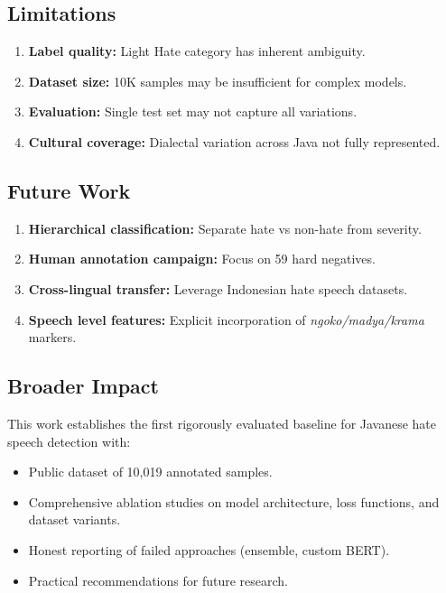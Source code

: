 \documentclass[10pt,journal]{IEEEtran}
\begin{document}
\subsection{Limitations}

\begin{enumerate}[leftmargin=*,noitemsep,topsep=0pt]
\item \textbf{Label quality:} Light Hate category has inherent ambiguity.
\item \textbf{Dataset size:} 10K samples may be insufficient for complex models.
\item \textbf{Evaluation:} Single test set may not capture all variations.
\item \textbf{Cultural coverage:} Dialectal variation across Java not fully represented.
\end{enumerate}

\subsection{Future Work}

\begin{enumerate}[leftmargin=*,noitemsep,topsep=0pt]
\item \textbf{Hierarchical classification:} Separate hate vs non-hate from severity.
\item \textbf{Human annotation campaign:} Focus on 59 hard negatives.
\item \textbf{Cross-lingual transfer:} Leverage Indonesian hate speech datasets.
\item \textbf{Speech level features:} Explicit incorporation of \textit{ngoko/madya/krama} markers.
\end{enumerate}

\subsection{Broader Impact}

This work establishes the first rigorously evaluated baseline for Javanese hate speech detection with:
\begin{itemize}[leftmargin=*,noitemsep,topsep=0pt]
\item Public dataset of 10,019 annotated samples.
\item Comprehensive ablation studies on model architecture, loss functions, and dataset variants.
\item Honest reporting of failed approaches (ensemble, custom BERT).
\item Practical recommendations for future research.
\end{itemize}
\end{document}
